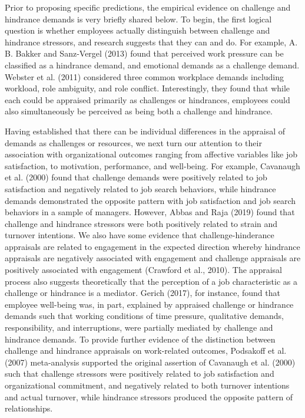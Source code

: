 \documentclass[
  man]{apa6}
\begin{document}
Prior to proposing specific predictions, the empirical evidence on challenge and hindrance demands is very briefly shared below. To begin, the first logical question is whether employees actually distinguish between challenge and hindrance stressors, and research suggests that they can and do. For example, A. B. Bakker and Sanz-Vergel (2013) found that perceived work pressure can be classified as a hindrance demand, and emotional demands as a challenge demand. Webster et al. (2011) considered three common workplace demands including workload, role ambiguity, and role conflict. Interestingly, they found that while each could be appraised primarily as challenges or hindrances, employees could also simultaneously be perceived as being both a challenge and hindrance.

Having established that there can be individual differences in the appraisal of demands as challenges or resources, we next turn our attention to their association with organizational outcomes ranging from affective variables like job satisfaction, to motivation, performance, and well-being. For example, Cavanaugh et al. (2000) found that challenge demands were positively related to job satisfaction and negatively related to job search behaviors, while hindrance demands demonstrated the opposite pattern with job satisfaction and job search behaviors in a sample of managers. However, Abbas and Raja (2019) found that challenge and hindrance stressors were both positively related to strain and turnover intentions. We also have some evidence that challenge-hinderance appraisals are related to engagement in the expected direction whereby hindrance appraisals are negatively associated with engagement and challenge appraisals are positively associated with engagement (Crawford et al., 2010). The appraisal process also suggests theoretically that the perception of a job characteristic as a challenge or hindrance is a mediator. Gerich (2017), for instance, found that employee well-being was, in part, explained by appraised challenge or hindrance demands such that working conditions of time pressure, qualitative demands, responsibility, and interruptions, were partially mediated by challenge and hindrance demands. To provide further evidence of the distinction between challenge and hindrance appraisals on work-related outcomes, Podsakoff et al. (2007) meta-analysis supported the original assertion of Cavanaugh et al. (2000) such that challenge stressors were positively related to job satisfaction and organizational commitment, and negatively related to both turnover intentions and actual turnover, while hindrance stressors produced the opposite pattern of relationships.
\end{document}
